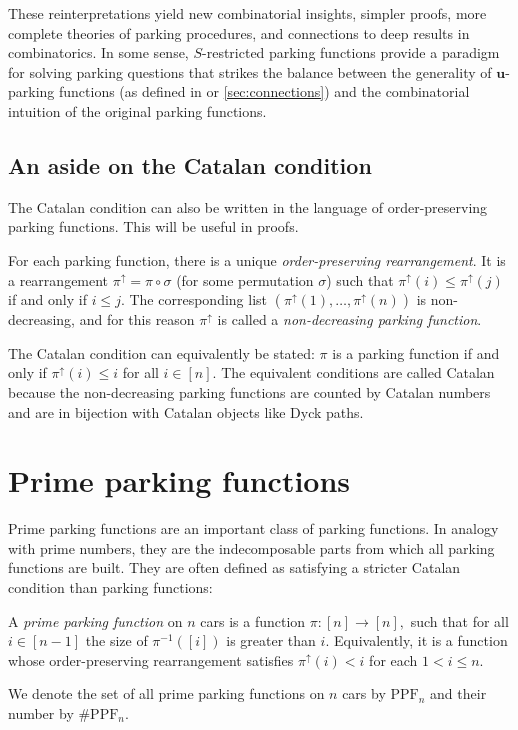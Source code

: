 \documentclass[12pt]{article}
\begin{document}
These reinterpretations yield new combinatorial insights, simpler proofs, more complete theories of parking procedures, and connections to deep results in combinatorics. In some sense, $S$-restricted parking functions provide a paradigm for solving parking questions that strikes the balance between the generality of $\mathbf{u}$-parking functions (as defined in \cite{yan-survey-2015} or \cref{sec:connections}) and the combinatorial intuition of the original parking functions.

\subsection{An aside on the Catalan condition}

The Catalan condition can also be written in the language of order-preserving parking functions. This will be useful in proofs.

For each parking function, there is a unique \emph{order-preserving rearrangement}. It is a rearrangement $\pi^{\uparrow} = \pi \circ \sigma$ (for some permutation $\sigma$) such that $\pi^\uparrow(i)\le \pi^\uparrow(j)$ if and only if $i\le j$. The corresponding list $(\pi^{\uparrow}(1), \dots, \pi^{\uparrow}(n))$ is non-decreasing, and for this reason $\pi^{\uparrow}$ is called a \emph{non-decreasing parking function}. 

The Catalan condition can equivalently be stated: $\pi$ is a parking function if and only if $\pi^\uparrow(i) \le i$ for all $i \in [n]$. The equivalent conditions are called Catalan because the non-decreasing parking functions are counted by Catalan numbers and are in bijection with Catalan objects like Dyck paths.

\section{Prime parking functions} \label{primesection}

Prime parking functions are an important class of parking functions. In analogy with prime numbers, they are the indecomposable parts from which all parking functions are built. They are often defined as satisfying a stricter Catalan condition than parking functions:

\begin{definition}
	A \emph{prime parking function} on $n$ cars is a function $\pi : [n] \to [n],$ such that for all $i\in[n-1]$ the size of $\pi^{-1}([i])$ is greater than $i$. Equivalently, it is a function whose order-preserving rearrangement satisfies $ \pi^{\uparrow}(i) < i$ for each $1<i\le n$. 

	We denote the set of all prime parking functions on $n$ cars by $\mathrm{PPF}_{n}$ and their number by $\# \mathrm{P P F}_{n}$.
\end{definition}
\end{document}

